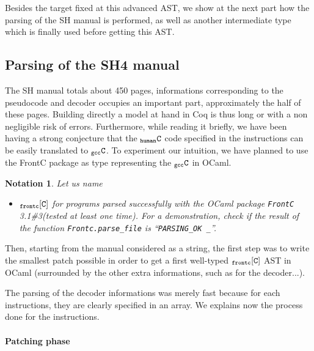 \documentclass[a4paper, 11pt]{article}
\newcommand{\frontcv}{3.1\#3\xspace}
\newcommand{\gccC}{$_{\tt gcc}{\tt C}$\xspace}
\newcommand{\hC}{$_{\tt human}{\tt C}$\xspace}
\newcommand{\frontC}{$_{\tt frontc}{\tt [C]}$\xspace}
\newtheorem*{note}{Notation}
\begin{document}
Besides the target fixed at this advanced AST, we show at the next part how the parsing of the SH manual is performed, as well as another intermediate type which is finally used before getting this AST.


  \subsection{Parsing of the SH4 manual}
The SH manual totals about 450 pages, informations corresponding to the pseudocode and decoder occupies an important part, approximately the half of these pages. Building directly a model at hand in Coq is thus long or with a non negligible risk of errors. 
Furthermore, while reading it briefly, we have been having a strong conjecture that the \hC code specified in the instructions can be easily translated to \gccC. To experiment our intuition, we have planned to use the FrontC package as type representing the \gccC in OCaml.
\begin{note}
Let us name
\begin{itemize}
\item \frontC for programs parsed successfully with the OCaml package {\tt FrontC} \frontcv (tested at least one time). For a demonstration, check if the result of the function \verb|Frontc.parse_file| is ``\verb|PARSING_OK _|''. 
\end{itemize}
\end{note}
Then, starting from the manual considered as a string, the first step was to write the smallest patch possible in order to get a first well-typed \frontC AST in OCaml (surrounded by the other extra informations, such as for the decoder...).

The parsing of the decoder informations was merely fast because for each instructions, they are clearly specified in an array. We explains now the process done for the instructions.

\paragraph{Patching phase}
\end{document}
